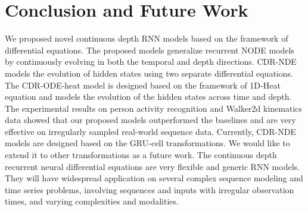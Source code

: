 \documentclass{article} %
\begin{document}
\section{Conclusion and Future Work}
We proposed novel continuous depth RNN models based on the framework of  differential equations. The proposed models generalize recurrent NODE models by continuously evolving in both the temporal and depth directions. CDR-NDE models the evolution of hidden states using two separate differential equations. The CDR-ODE-heat model is designed based on the framework of 1D-Heat equation and models the evolution of the hidden states across time and depth. The experimental results on person activity recognition and Walker2d kinematics data showed that our proposed models outperformed the baselines and are very effective on irregularly sampled real-world sequence data.   
Currently,  CDR-NDE models are designed based on the  GRU-cell  transformations. We would like to extend it to other transformations as a future work.
The continuous depth recurrent neural differential equations are very flexible and generic RNN models. They will have widespread application on several complex sequence modeling and time series problems, involving  sequences and  inputs with irregular observation times, and  varying complexities and modalities. 




\end{document}

